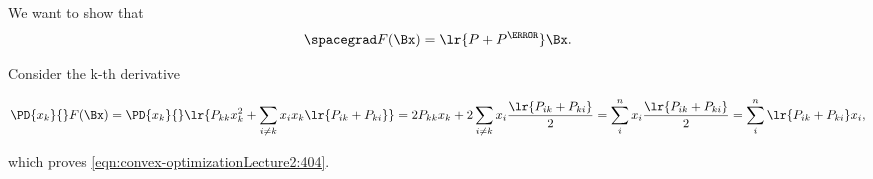 {We want to show that
\begin{dmath}\label{eqn:convex-optimizationLecture2:404}
\spacegrad F(\Bx) = \lr{P + P^\T } \Bx.
\end{dmath}

Consider the k-th derivative

\begin{dmath}\label{eqn:convex-optimizationLecture2:424}
\PD{x_k}{} F(\Bx)
=
\PD{x_k}{}
\lr{
P_{kk} x_k^2
+
\sum_{i \ne k} x_i x_k \lr{ P_{ik} + P_{ki} }
}
=
2 P_{kk} x_k + 2
\sum_{i \ne k} x_i \frac{\lr{ P_{ik} + P_{ki} }}{2}
=
\sum_{i}^n x_i \frac{\lr{ P_{ik} + P_{ki} }}{2}
=
\sum_{i}^n \lr{ P_{ik} + P_{ki} } x_i
,
\end{dmath}

which proves \cref{eqn:convex-optimizationLecture2:404}.
} %
